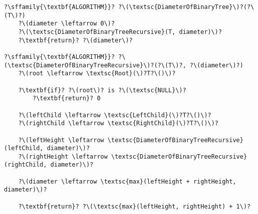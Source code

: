 \begin{verbatim}
?\sffamily{\textbf{ALGORITHM}}? ?\(\textsc{DiameterOfBinaryTree}\)?(?\(T\)?)
    ?\(diameter \leftarrow 0\)?
    ?\(\textsc{DiameterOfBinaryTreeRecursive}(T, diameter)\)?
    ?\textbf{return}? ?\(diameter\)?

?\sffamily{\textbf{ALGORITHM}}? ?\(\textsc{DiameterOfBinaryTreeRecursive}\)?(?\(T\)?, ?\(diameter\)?)
    ?\(root \leftarrow \textsc{Root}(\)?T?\()\)?

    ?\textbf{if}? ?\(root\)? is ?\(\textsc{NULL}\)?
        ?\textbf{return}? 0

    ?\(leftChild \leftarrow \textsc{LeftChild}(\)?T?\()\)?
    ?\(rightChild \leftarrow \textsc{RightChild}(\)?T?\()\)?

    ?\(leftHeight \leftarrow \textsc{DiameterOfBinaryTreeRecursive}(leftChild, diameter)\)?
    ?\(rightHeight \leftarrow \textsc{DiameterOfBinaryTreeRecursive}(rightChild, diameter)\)?

    ?\(diameter \leftarrow \textsc{max}(leftHeight + rightHeight, diameter)\)?

    ?\textbf{return}? ?\(\textsc{max}(leftHeight, rightHeight) + 1\)?
\end{verbatim}